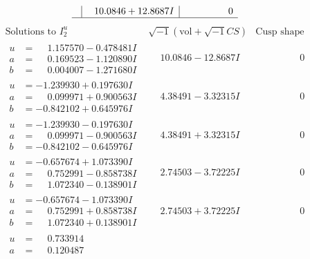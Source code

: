 \documentclass[1p]{elsarticle_modified}
\theoremstyle{definition}
\newcommand{\I}{\sqrt{-1}}
\begin{document}
$$\begin{array}{c|c|c}
 & \phantom{-}10.0846 + 12.8687 I & \phantom{-0.000000 } 0\\
 \hline 
 \end{array}$$\newpage$$\begin{array}{c|c|c}  
\text{Solutions to }I^u_{2}& \I (\text{vol} + \sqrt{-1}CS) & \text{Cusp shape}\\
 \hline 
\begin{aligned}
u &= \phantom{-}1.157570 - 0.478481 I \\
a &= \phantom{-}0.169523 - 1.120890 I \\
b &= \phantom{-}0.004007 - 1.271680 I\end{aligned}
 & \phantom{-}10.0846 - 12.8687 I & \phantom{-0.000000 } 0 \\ \hline\begin{aligned}
u &= -1.239930 + 0.197630 I \\
a &= \phantom{-}0.099971 + 0.900563 I \\
b &= -0.842102 + 0.645976 I\end{aligned}
 & \phantom{-}4.38491 - 3.32315 I & \phantom{-0.000000 } 0 \\ \hline\begin{aligned}
u &= -1.239930 - 0.197630 I \\
a &= \phantom{-}0.099971 - 0.900563 I \\
b &= -0.842102 - 0.645976 I\end{aligned}
 & \phantom{-}4.38491 + 3.32315 I & \phantom{-0.000000 } 0 \\ \hline\begin{aligned}
u &= -0.657674 + 1.073390 I \\
a &= \phantom{-}0.752991 - 0.858738 I \\
b &= \phantom{-}1.072340 - 0.138901 I\end{aligned}
 & \phantom{-}2.74503 - 3.72225 I & \phantom{-0.000000 } 0 \\ \hline\begin{aligned}
u &= -0.657674 - 1.073390 I \\
a &= \phantom{-}0.752991 + 0.858738 I \\
b &= \phantom{-}1.072340 + 0.138901 I\end{aligned}
 & \phantom{-}2.74503 + 3.72225 I & \phantom{-0.000000 } 0 \\ \hline\begin{aligned}
u &= \phantom{-}0.733914\phantom{ +0.000000I} \\
a &= \phantom{-}0.120487\phantom{ +0.000000I} \\

\end{aligned}
\end{array}$$
\end{document}
